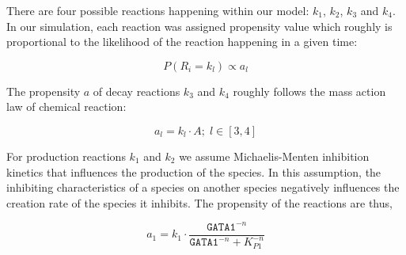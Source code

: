 \documentclass{bioinfo}
\begin{document}
\begin{center}
\end{center}

There are four possible reactions happening within our model: $k_1$, $k_2$, $k_3$ and $k_4$. In our simulation, each reaction was assigned propensity value which roughly is proportional to the likelihood of the reaction happening in a given time:

\begin{equation}
P(R_i = k_l) \propto a_l\label{eq:22}
\end{equation}

The propensity $a$ of decay reactions $k_3$ and $k_4$ roughly follows the mass action law of chemical reaction:

\begin{equation}
a_l = k_l \cdot A {;} \; l \in [3, 4]\label{eq:23}
\end{equation}

For production reactions $k_1$ and $k_2$ we assume Michaelis-Menten inhibition kinetics that influences the production of the species. In this assumption, the inhibiting characteristics of a species on another species negatively influences the creation rate of the species it inhibits. The propensity of the reactions are thus,

\begin{equation}
a_1 = k_1 \cdot \frac{\texttt{GATA1}^{-n}}{\texttt{GATA1}^{-n} + K_{P1}^{-n}}\label{eq:24}
\end{equation}
\end{document}
